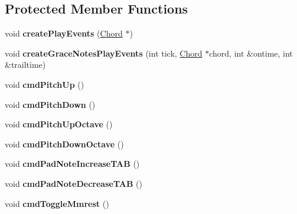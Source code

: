 \subsection*{Protected Member Functions}
\begin{DoxyCompactItemize}
\item 
\mbox{\label{class_ms_1_1_score_a238e845d7b6a1e04230d35934cd00a74}} 
void {\bfseries create\+Play\+Events} (\hyperlink{class_ms_1_1_chord}{Chord} $\ast$)
\item 
\mbox{\label{class_ms_1_1_score_a13508aa492481d60223cd9b919839db0}} 
void {\bfseries create\+Grace\+Notes\+Play\+Events} (int tick, \hyperlink{class_ms_1_1_chord}{Chord} $\ast$chord, int \&ontime, int \&trailtime)
\item 
\mbox{\label{class_ms_1_1_score_a5688f77578f96d12e56f3aa69f70ffec}} 
void {\bfseries cmd\+Pitch\+Up} ()
\item 
\mbox{\label{class_ms_1_1_score_a55f8ec78968f321afca7737d3785683f}} 
void {\bfseries cmd\+Pitch\+Down} ()
\item 
\mbox{\label{class_ms_1_1_score_a312785d5c5f5d76fe8d5989faf6eadfd}} 
void {\bfseries cmd\+Pitch\+Up\+Octave} ()
\item 
\mbox{\label{class_ms_1_1_score_abda2ce881c2ac1f14c41ee88347db34b}} 
void {\bfseries cmd\+Pitch\+Down\+Octave} ()
\item 
\mbox{\label{class_ms_1_1_score_aaadebd0d85b363c17fccaef0576a2343}} 
void {\bfseries cmd\+Pad\+Note\+Increase\+T\+AB} ()
\item 
\mbox{\label{class_ms_1_1_score_a28d7ab642a1dfbc52f7082393195c917}} 
void {\bfseries cmd\+Pad\+Note\+Decrease\+T\+AB} ()
\item 
\mbox{\label{class_ms_1_1_score_a6eb8c669bccea2b906aa764ec2028510}} 
void {\bfseries cmd\+Toggle\+Mmrest} ()
\item 
\mbox{\label{class_ms_1_1_score_a44c0ecc77a206b90ece32626a3f53046}} 

\end{DoxyCompactItemize}
